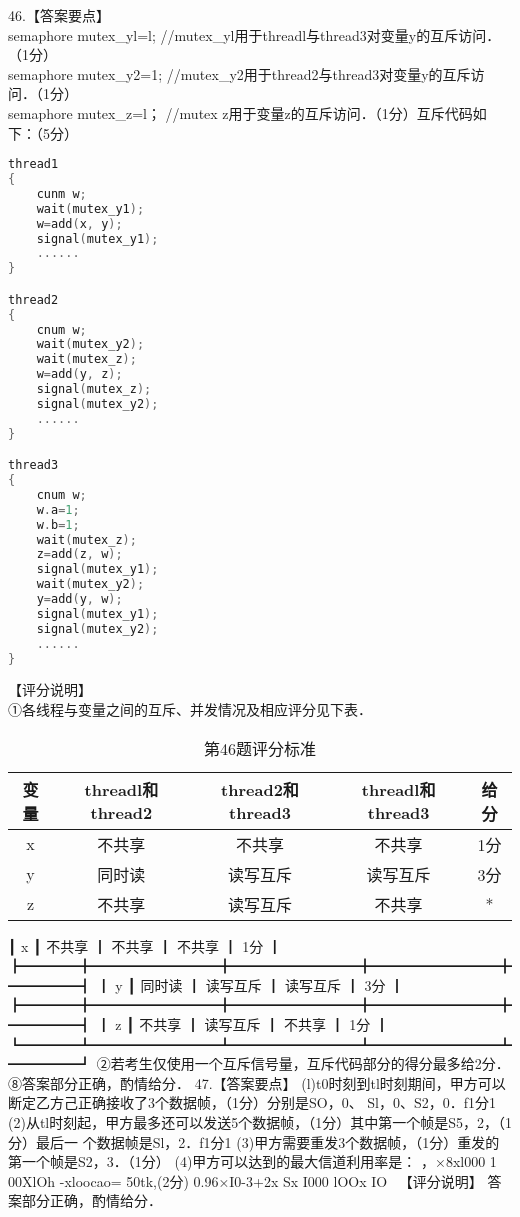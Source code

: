 46.【答案要点】 \\
semaphore mutex_yl=l;  //mutex_yl用于threadl与thread3对变量y的互斥访问．（1分） \\
semaphore mutex_y2=1;  //mutex_y2用于thread2与thread3对变量y的互斥访问．（1分） \\
semaphore mutex_z=l；  //mutex z用于变量z的互斥访问．（1分）互斥代码如下：（5分） \\
\begin{lstlisting}[language=cpp]
thread1
{
    cunm w;
    wait(mutex_y1);
    w=add(x, y);
    signal(mutex_y1);
    ......
}

thread2
{
    cnum w;
    wait(mutex_y2);
    wait(mutex_z);
    w=add(y, z);
    signal(mutex_z);
    signal(mutex_y2);
    ......
}

thread3
{
    cnum w;
    w.a=1;
    w.b=1;
    wait(mutex_z);
    z=add(z, w);
    signal(mutex_y1);
    wait(mutex_y2);
    y=add(y, w);
    signal(mutex_y1);
    signal(mutex_y2);
    ......
}
\end{lstlisting}
【评分说明】 \\
①各线程与变量之间的互斥、并发情况及相应评分见下表．
\begin{table}[ht]
\centering
\caption{第46题评分标准}\label{CSN17_tab4}
\begin{tabular}{|c|c|c|c|c|}
\hline
变量 & threadl和thread2 & thread2和thread3 & threadl和thread3 & 给分 \\
\hline
x & 不共享 & 不共享 & 不共享 & 1分 \\
\hline
y & 同时读 & 读写互斥 & 读写互斥 & 3分 \\
\hline
z & 不共享 & 读写互斥 & 不共享 & * \\
\hline
\end{tabular}
\end{table}

┃    x   ┃    不共享        ┃    不共享        ┃    不共享        ┃    1分   ┃
┣━━━━╋━━━━━━━━━╋━━━━━━━━━╋━━━━━━━━━╋━━━━━┫
┃    y   ┃    同时读        ┃    读写互斥      ┃    读写互斥      ┃    3分   ┃
┣━━━━╋━━━━━━━━━╋━━━━━━━━━╋━━━━━━━━━╋━━━━━┫
┃    z   ┃    不共享        ┃    读写互斥      ┃    不共享        ┃    1分   ┃
┗━━━━┻━━━━━━━━━┻━━━━━━━━━┻━━━━━━━━━┻━━━━━┛
    ②若考生仅使用一个互斥信号量，互斥代码部分的得分最多给2分．
    ⑧答案部分正确，酌情给分．
    47.【答案要点】
    (l)t0时刻到tl时刻期间，甲方可以断定乙方己正确接收了3个数据帧，（1分）分别是SO，0、
Sl，0、S2，0．f1分1
    (2)从tl时刻起，甲方最多还可以发送5个数据帧，（1分）其中第一个帧是S5，2，（1分）最后一
个数据帧是Sl，2．f1分1
    (3)甲方需要重发3个数据帧，（1分）重发的第一个帧是S2，3．（1分）
    (4)甲方可以达到的最大信道利用率是：
    ，×8xl000
    1 00XlOh
    -xloocao= 50tk,(2分)
    0.96×I0-3+2x Sx I000
    lOOx IO~
【评分说明】
答案部分正确，酌情给分．